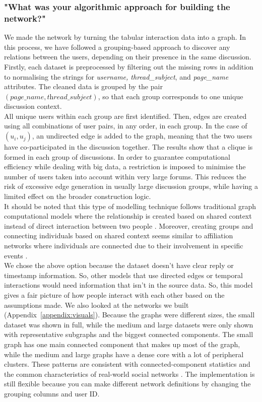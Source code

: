 \documentclass[acmsmall,nonacm,natbib=false]{acmart}
\begin{document}
\subsubsection{\large{\textbf{"What was your algorithmic approach for building the network?"}}}
\leavevmode \par \noindent
We made the network by turning the tabular interaction data into a graph. In this process, we have followed a grouping-based approach to discover any relations between the users, depending on their presence in the same discussion. Firstly, each dataset is preprocessed by filtering out the missing rows in addition to normalising the strings for \textit{username, thread\_subject}, and \textit{page\_name} attributes. The cleaned data is grouped by the pair \((\textit{page\_name}, \textit{thread\_subject})\), so that each group corresponds to one unique discussion context.\\
All unique users within each group are first identified. Then, edges are created using all combinations of user pairs, in any order, in each group. In the case of \( (u_i, u_j) \), an undirected edge is added to the graph, meaning that the two users have co-participated in the discussion together. The results show that a clique is formed in each group of discussions. In order to guarantee computational efficiency while dealing with big data, a restriction is imposed to minimise the number of users taken into account within very large forums. This reduces the risk of excessive edge generation in usually large discussion groups, while having a limited effect on the broader construction logic.\\
It should be noted that this type of modelling technique follows traditional graph computational models where the relationship is created based on shared context instead of direct interaction between two people \cite{newman2010networks}. Moreover, creating groups and connecting individuals based on shared context seems similar to affiliation networks where individuals are connected due to their involvement in specific events \cite{easley2010networks}.\\
We chose the above option because the dataset doesn't have clear reply or timestamp information.
So, other models that use directed edges or temporal interactions would need information that isn't in the source data. So, this model gives a fair picture of how people interact with each other based on the assumptions made. We also looked at the networks we built (Appendix~\ref{appendix:visuals}). Because the graphs were different sizes, the small dataset was shown in full, while the medium and large datasets were only shown with representative subgraphs and the biggest connected components. The small graph has one main connected component that makes up most of the graph, while the medium and large graphs have a dense core with a lot of peripheral clusters. These patterns are consistent with connected-component statistics and the common characteristics of real-world social networks \cite{newman2010networks, watts1998collective, easley2010networks}. The implementation is still flexible because you can make different network definitions by changing the grouping columns and user ID.
\end{document}
